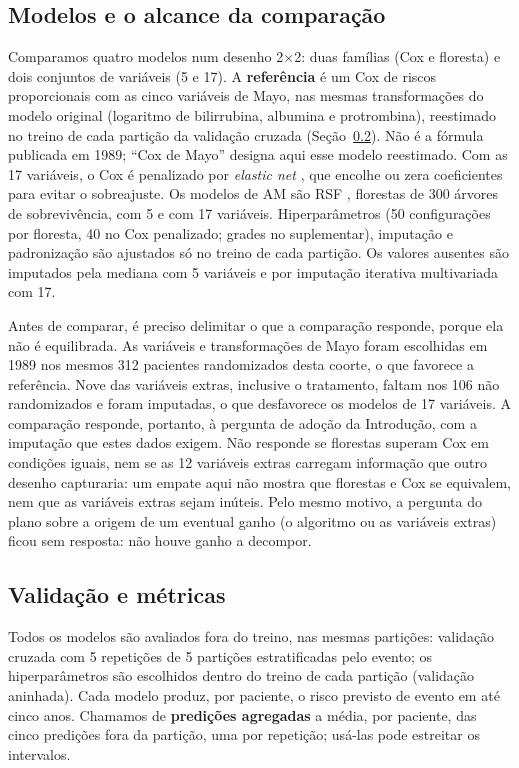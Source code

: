 \documentclass[12pt]{article}
\begin{document}
\subsection{Modelos e o alcance da comparação}\label{subsec:modelos}

Comparamos quatro modelos num desenho 2$\times$2: duas famílias (Cox e floresta) e dois conjuntos de variáveis (5 e 17). A \textbf{referência} é um Cox de riscos proporcionais com as cinco variáveis de Mayo, nas mesmas transformações do modelo original (logaritmo de bilirrubina, albumina e protrombina), reestimado no treino de cada partição da validação cruzada (Seção~\ref{subsec:validacao}). Não é a fórmula publicada em 1989; ``Cox de Mayo'' designa aqui esse modelo reestimado. Com as 17 variáveis, o Cox é penalizado por \textit{elastic net} \cite{simon2011coxnet}, que encolhe ou zera coeficientes para evitar o sobreajuste. Os modelos de AM são RSF \cite{ishwaran2008rsf}, florestas de 300 árvores de sobrevivência, com 5 e com 17 variáveis. Hiperparâmetros (50 configurações por floresta, 40 no Cox penalizado; grades no suplementar), imputação e padronização são ajustados só no treino de cada partição. Os valores ausentes são imputados pela mediana com 5 variáveis e por imputação iterativa multivariada com 17.

Antes de comparar, é preciso delimitar o que a comparação responde, porque ela não é equilibrada. As variáveis e transformações de Mayo foram escolhidas em 1989 nos mesmos 312 pacientes randomizados desta coorte, o que favorece a referência. Nove das variáveis extras, inclusive o tratamento, faltam nos 106 não randomizados e foram imputadas, o que desfavorece os modelos de 17 variáveis. A comparação responde, portanto, à pergunta de adoção da Introdução, com a imputação que estes dados exigem. Não responde se florestas superam Cox em condições iguais, nem se as 12 variáveis extras carregam informação que outro desenho capturaria: um empate aqui não mostra que florestas e Cox se equivalem, nem que as variáveis extras sejam inúteis. Pelo mesmo motivo, a pergunta do plano sobre a origem de um eventual ganho (o algoritmo ou as variáveis extras) ficou sem resposta: não houve ganho a decompor.

\subsection{Validação e métricas}\label{subsec:validacao}

Todos os modelos são avaliados fora do treino, nas mesmas partições: validação cruzada com 5 repetições de 5 partições estratificadas pelo evento; os hiperparâmetros são escolhidos dentro do treino de cada partição (validação aninhada). Cada modelo produz, por paciente, o risco previsto de evento em até cinco anos. Chamamos de \textbf{predições agregadas} a média, por paciente, das cinco predições fora da partição, uma por repetição; usá-las pode estreitar os intervalos.
\end{document}
